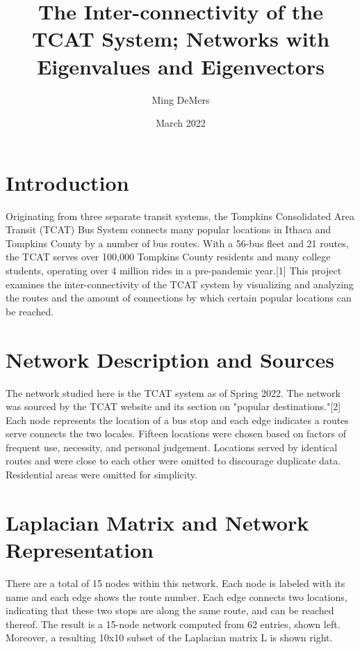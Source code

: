 \documentclass{article}
\title{The Inter-connectivity of the TCAT System; Networks with Eigenvalues and Eigenvectors}
\author{Ming DeMers}
\date{March 2022}
\begin{document}
\def\ind{\hspace*{0.3in}}
	\def\gap{0.2in}
\pagestyle{fancy}
\cfoot{\thepage}
\renewcommand{\headrulewidth}{0.4pt}
\renewcommand{\footrulewidth}{0.4pt}

\maketitle

\section{Introduction}
Originating from three separate transit systems, the Tompkins Consolidated Area Transit (TCAT) Bus System connects many popular locations in Ithaca and Tompkins County by a number of bus routes. With a 56-bus fleet and  21 routes, the TCAT serves over 100,000 Tompkins County residents and many college students, operating over 4 million rides in a pre-pandemic year.[1] This project examines the inter-connectivity of the TCAT system by visualizing and analyzing the routes and the amount of connections by which certain popular locations can be reached. 

\section{Network Description and Sources}
The network studied here is the TCAT system as of Spring 2022. The network was sourced by the TCAT website and its section on "popular destinations."[2] Each node represents the location of a bus stop and each edge indicates a routes serve connects the two locales. Fifteen locations were chosen based on factors of frequent use, necessity, and personal judgement. Locations served by identical routes and were close to each other were omitted to discourage duplicate data. Residential areas were omitted for simplicity. 

\section{Laplacian Matrix and Network Representation}
There are a total of 15 nodes within this network. Each node is labeled with its name and each edge shows the route number. Each edge connects two locations, indicating that these two stops are along the same route, and can be reached thereof. The result is a 15-node network computed from 62 entries, shown left. Moreover, a resulting 10x10 subset of the Laplacian matrix L is shown right.
\end{document}
